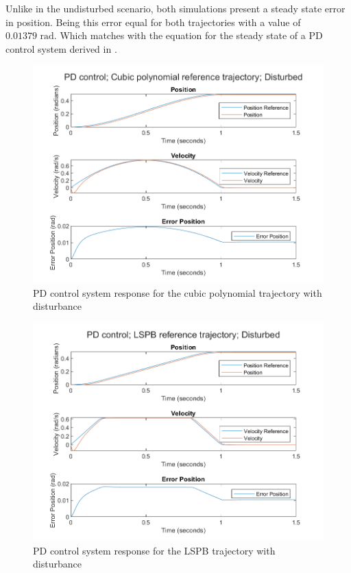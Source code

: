 Unlike in the undisturbed scenario, both simulations present a steady state
error in position. Being this error equal for both trajectories with a value of
$0.01379\text{ rad}$. Which matches with the equation for the steady state of a
PD control system derived in  \cite{SingleLink}.
\begin{figure}[h]
    \centering
    \includegraphics[width=.7\textwidth]{PD_cubic_disturbed.png}
    \caption{PD control system response for the cubic polynomial trajectory
    with disturbance}
    \label{fig:PD_cubic_disturbed}
\end{figure}

\begin{figure}[h]
    \centering
    \includegraphics[width=.7\textwidth]{PD_LSPB_disturbed.png}
    \caption{PD control system response for the LSPB trajectory with disturbance}
    \label{fig:PD_LSPB_disturbed}
\end{figure}